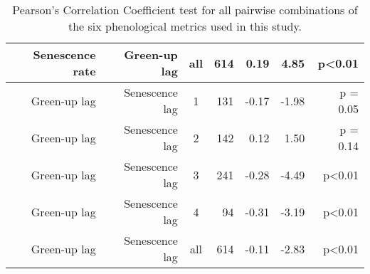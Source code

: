 \begin{table}[H]
\begin{tabular}{rrcrrrr}
  Senescence rate & Green-up lag & all & 614 & 0.19 & 4.85 & p<0.01 \\ 
   \hline
Green-up lag & Senescence lag & 1 & 131 & -0.17 & -1.98 & p = 0.05 \\ 
  Green-up lag & Senescence lag & 2 & 142 & 0.12 & 1.50 & p = 0.14 \\ 
  Green-up lag & Senescence lag & 3 & 241 & -0.28 & -4.49 & p<0.01 \\ 
  Green-up lag & Senescence lag & 4 &  94 & -0.31 & -3.19 & p<0.01 \\ 
  Green-up lag & Senescence lag & all & 614 & -0.11 & -2.83 & p<0.01 \\ 
   \hline
\end{tabular}
\caption{Pearson's Correlation Coefficient test for all pairwise combinations of the six phenological metrics used in this study.} 
\label{phen_corr}
\end{table}

